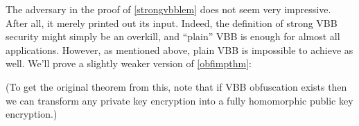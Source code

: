 The adversary in the proof of \cref{strongvbblem} does not seem very
impressive. After all, it merely printed out its input. Indeed, the
definition of strong VBB security might simply be an overkill, and
``plain'' VBB is enough for almost all applications. However, as
mentioned above, plain VBB is impossible to achieve as well. We'll prove
a slightly weaker version of \cref{obfimpthm}:

\hypertarget{obfimpweakthm}{}

(To get the original theorem from this, note that if VBB obfuscation
exists then we can transform any private key encryption into a fully
homomorphic public key encryption.)

